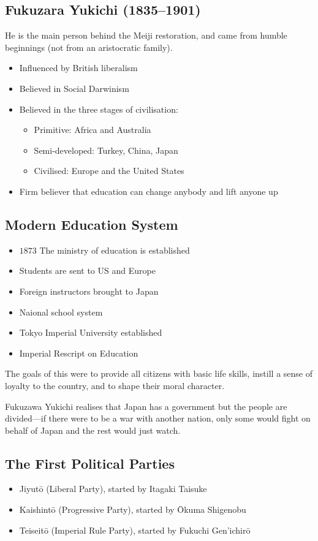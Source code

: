 \documentclass[class=article, crop=false]{standalone}
\begin{document}
  \subsection{Fukuzara Yukichi (1835--1901)}
  He is the main person behind the Meiji restoration, and came from humble beginnings (not from an aristocratic family).
  \begin{itemize}
    \item Influenced by British liberalism
    \item Believed in Social Darwinism
    \item Believed in the three stages of civilisation:
    \begin{itemize}
      \item Primitive: Africa and Australia
      \item Semi-developed: Turkey, China, Japan
      \item Civilised: Europe and the United States
    \end{itemize}
    \item Firm believer that education can change anybody and lift anyone up
  \end{itemize}
  \subsection{Modern Education System}
  \begin{itemize}
    \item $1873$ The ministry of education is established
    \item Students are sent to US and Europe
    \item Foreign instructors brought to Japan
    \item Naional school system
    \item Tokyo Imperial University established
    \item Imperial Rescript on Education
  \end{itemize}
  \begin{note}{}
    The goals of this were to provide all citizens with basic life skills, instill a sense of loyalty to the country, and to shape their moral character.
  \end{note}
  Fukuzawa Yukichi realises that Japan has a government but the people are divided---if there were to be a war with another nation, only some would fight on behalf of Japan and the rest would just watch.
  \subsection{The First Political Parties}
  \begin{itemize}
    \item Jiyut\=o (Liberal Party), started by Itagaki Taisuke
    \item Kaishint\=o (Progressive Party), started by \=Okuma Shigenobu
    \item Teiseit\=o (Imperial Rule Party), started by Fukuchi Gen'ichir\=o
  \end{itemize}
\end{document}
